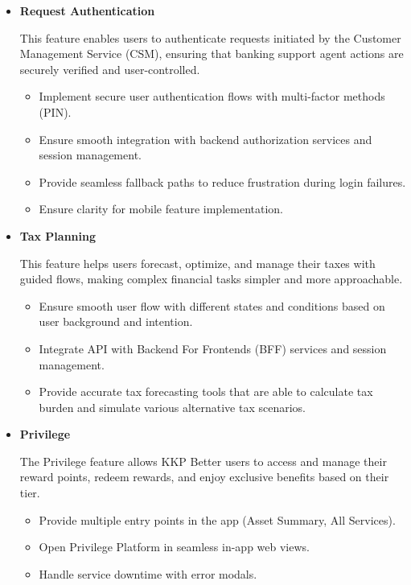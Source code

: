 \documentclass[12pt,oneside,openright,a4paper]{cpe-english-project}
\begin{document}
\begin{itemize}
\item \textbf{Request Authentication}

This feature enables users to authenticate requests initiated by the
Customer Management Service (CSM), ensuring that banking support agent
actions are securely verified and user-controlled.

  \begin{itemize}
  \item Implement secure user authentication flows with multi-factor methods (PIN).
  \item Ensure smooth integration with backend authorization services and session management.
  \item Provide seamless fallback paths to reduce frustration during login failures.
  \item Ensure clarity for mobile feature implementation.
  \end{itemize}

\item \textbf{Tax Planning}

This feature helps users forecast, optimize, and manage their taxes with
guided flows, making complex financial tasks simpler and more
approachable.

  \begin{itemize}
  \item Ensure smooth user flow with different states and conditions based on user background and intention.
  \item Integrate API with Backend For Frontends (BFF) services and session management.
  \item Provide accurate tax forecasting tools that are able to calculate tax burden and simulate various alternative tax scenarios.
  \end{itemize}

\item \textbf{Privilege}

The Privilege feature allows KKP Better users to access and manage their
reward points, redeem rewards, and enjoy exclusive benefits based on
their tier.

  \begin{itemize}
  \item Provide multiple entry points in the app (Asset Summary, All Services).
  \item Open Privilege Platform in seamless in-app web views.
  \item Handle service downtime with error modals.
  \end{itemize}


\end{itemize}
\end{document}
